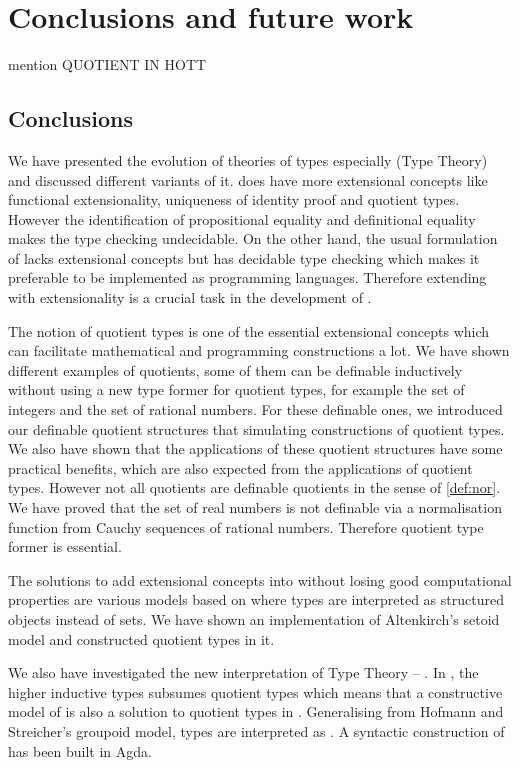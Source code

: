 \chapter{Conclusions and future work}


mention QUOTIENT IN HOTT

\section{Conclusions}

We have presented the evolution of theories of types especially \mltt (Type Theory) and discussed different variants of it. \ett does have more extensional concepts like functional extensionality, uniqueness of identity proof and quotient types. However the identification of propositional equality and definitional equality makes the type checking undecidable. On the other hand, the usual formulation of \itt lacks extensional concepts but has decidable type checking which makes it preferable to be implemented as programming languages. Therefore extending \itt with extensionality is a crucial task in the development of \mltt.

The notion of quotient types is one of the essential extensional concepts which can facilitate mathematical and programming constructions a lot. We have shown different examples of quotients, some of them can be definable inductively without using a new type former for quotient types, for example the set of integers and the set of rational numbers. For these definable ones, we introduced our definable quotient structures that simulating constructions of quotient types. We also have shown that the applications of these quotient structures have some practical benefits, which are also expected from 
the applications of quotient types.
However not all quotients are definable quotients in the sense of \autoref{def:nor}. We have proved that the set of real numbers is not definable via a normalisation function from Cauchy sequences of rational numbers. Therefore quotient type former is essential.

The solutions to add extensional concepts into \itt without losing good computational properties are various models based on \itt where types are interpreted as structured objects instead of sets. We have shown an implementation of Altenkirch's setoid model and constructed quotient types in it.

We also have investigated the new interpretation of Type Theory -- \hott. In \hott, the higher inductive types subsumes quotient types which means that a constructive model of \hott is also a solution to quotient types in \itt.
Generalising from Hofmann and Streicher's groupoid model, types are interpreted as \wog. A syntactic construction of \wog has been built in Agda. 

